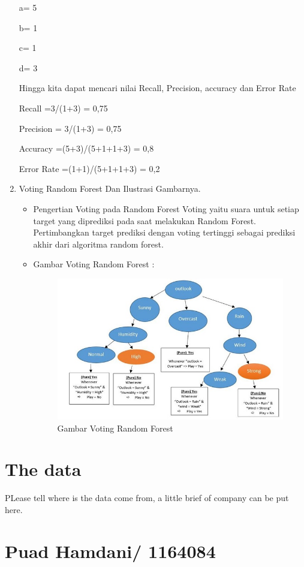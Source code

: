 \begin{enumerate}
a= 5

b= 1

c= 1

d= 3

Hingga kita dapat mencari nilai Recall, Precision, accuracy dan Error Rate

Recall =3/(1+3) = 0,75

Precision = 3/(1+3) = 0,75

Accuracy =(5+3)/(5+1+1+3) = 0,8

Error Rate =(1+1)/(5+1+1+3) = 0,2

\item Voting Random Forest Dan Ilustrasi Gambarnya.

\begin{itemize}
\item Pengertian Voting pada Random Forest
Voting yaitu suara untuk setiap target yang diprediksi pada saat melakukan Random Forest. Pertimbangkan target prediksi dengan voting tertinggi sebagai prediksi akhir dari algoritma random forest.

\item Gambar Voting Random Forest :
\begin{figure}[ht]
\centering
\includegraphics[scale=0.8]{figures/c3jesron9.jpg}
\caption{Gambar Voting Random Forest}
\label{contoh}
\end{figure}
\end{itemize}
\end{enumerate}

\section{The data}
PLease tell where is the data come from, a little brief of company can be put here.
\section {Puad Hamdani/ 1164084}
